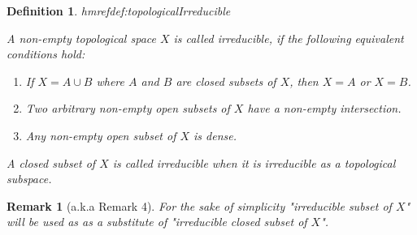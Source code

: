 \documentclass[DIV=14,parskip=full,pointednumbers]{scrartcl}
\newenvironment{alphanumerate}{\begin{enumerate}[label={\upshape(\alph*)}]}{\end{enumerate}}
\theoremstyle{cthm}
\theoremstyle{cdef}
\newtheorem{defi}{Definition}[subsection]
\newtheorem{rem}{Remark}[subsection]
\newcommand{\lbl}[1]{
	\label{#1}
	\edef\dummy{\curthm}
	\expandafter\xdef\csname thmref#1\endcsname{\dummy}
}
\begin{document}
\begin{defi}\lbl{def:topologicalIrreducible}
 A non-empty topological space $X$ is called \emph{irreducible},  if the following equivalent conditions hold:
 \begin{alphanumerate}
  \item If $X=A\cup B$ where $A$ and $B$ are closed subsets of $X$, then $X=A$ or $X=B$. 
  \item Two arbitrary non-empty open subsets of $X$ have a non-empty intersection.
  \item Any non-empty open subset of $X$ is dense.
 \end{alphanumerate}
A closed subset of $X$ is called irreducible when it is irreducible as a topological subspace.
\end{defi}
\begin{rem}[a.k.a Remark 4]
 For the sake of simplicity "irreducible subset of $X$" will be used as as a substitute of "irreducible closed subset of $X$".
\end{rem}
\end{document}
